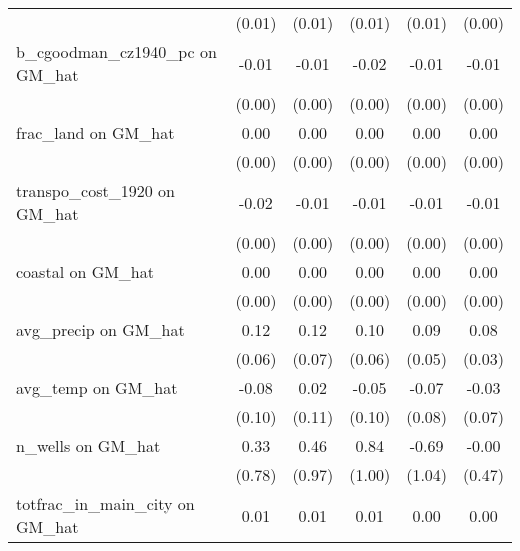 \begin{table}[htbp]
\begin{tabular}{l*{5}{c}}
                &   (0.01)         &   (0.01)         &   (0.01)         &   (0.01)         &   (0.00)         \\
\addlinespace
b\_cgoodman\_cz1940\_pc on GM\_hat&    -0.01\sym{***}&    -0.01\sym{**} &    -0.02\sym{***}&    -0.01\sym{**} &    -0.01\sym{***}\\
                &   (0.00)         &   (0.00)         &   (0.00)         &   (0.00)         &   (0.00)         \\
\addlinespace
frac\_land on GM\_hat&     0.00\sym{*}  &     0.00\sym{*}  &     0.00\sym{*}  &     0.00\sym{*}  &     0.00\sym{***}\\
                &   (0.00)         &   (0.00)         &   (0.00)         &   (0.00)         &   (0.00)         \\
\addlinespace
transpo\_cost\_1920 on GM\_hat&    -0.02\sym{**} &    -0.01\sym{**} &    -0.01\sym{***}&    -0.01\sym{*}  &    -0.01\sym{**} \\
                &   (0.00)         &   (0.00)         &   (0.00)         &   (0.00)         &   (0.00)         \\
\addlinespace
coastal on GM\_hat&     0.00         &     0.00         &     0.00         &     0.00         &     0.00         \\
                &   (0.00)         &   (0.00)         &   (0.00)         &   (0.00)         &   (0.00)         \\
\addlinespace
avg\_precip on GM\_hat&     0.12         &     0.12         &     0.10         &     0.09         &     0.08\sym{*}  \\
                &   (0.06)         &   (0.07)         &   (0.06)         &   (0.05)         &   (0.03)         \\
\addlinespace
avg\_temp on GM\_hat&    -0.08         &     0.02         &    -0.05         &    -0.07         &    -0.03         \\
                &   (0.10)         &   (0.11)         &   (0.10)         &   (0.08)         &   (0.07)         \\
\addlinespace
n\_wells on GM\_hat&     0.33         &     0.46         &     0.84         &    -0.69         &    -0.00         \\
                &   (0.78)         &   (0.97)         &   (1.00)         &   (1.04)         &   (0.47)         \\
\addlinespace
totfrac\_in\_main\_city on GM\_hat&     0.01\sym{**} &     0.01\sym{**} &     0.01\sym{**} &     0.00\sym{**} &     0.00\sym{***}\\

\end{tabular}
\end{table}
